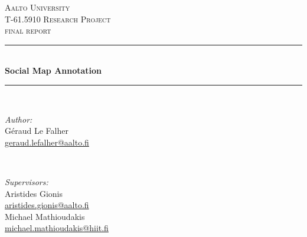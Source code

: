 \begin{titlepage}

\newcommand{\HRule}{\rule{\linewidth}{0.4mm}} %

\center %
 

\textsc{\LARGE Aalto University}\\[1.5cm] %
\textsc{\Large T-61.5910 Research Project}\\[0.5cm] %
\textsc{\large final report}\\[0.5cm] %


\HRule \\[0.4cm]
{ \huge \bfseries Social Map Annotation}\\[0.5\baselineskip] %
\HRule \\[1.5cm]
 

\begin{minipage}{0.4\textwidth}
\begin{flushleft} \large
\emph{Author:}\\
Géraud Le Falher\\
{\footnotesize\url{geraud.lefalher@aalto.fi}}
\end{flushleft}
\end{minipage}
~
\begin{minipage}{0.4\textwidth}
\begin{flushright} \large
\emph{Supervisors:}\\
Aristides Gionis\\
	{\footnotesize\url{aristides.gionis@aalto.fi}}\\[\baselineskip]
	Michael Mathioudakis\\
	{\footnotesize\url{michael.mathioudakis@hiit.fi}}
\end{flushright}
\end{minipage}\\[3cm]


\end{titlepage}
